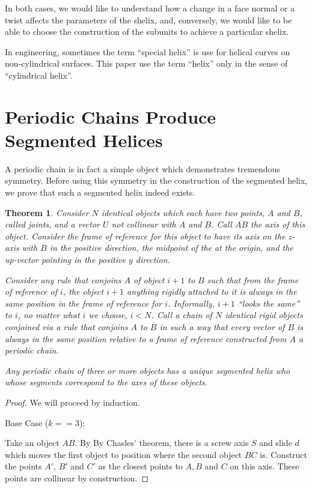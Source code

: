 \documentclass[11pt]{article}
\newtheorem{theorem}{Theorem}
\begin{document}
{In both cases, we would like to understand how a change in a face normal or a twist affects the parameters of the shelix,
and, conversely, we would like to be able to choose the construction of the subunits to achieve a particular shelix.

In engineering, sometimes the term ``special helix''\cite{gu2012research} is use for helical curves on non-cylindrical surfaces. This paper use the term ``helix'' only in the sense of ``cylindrical helix''.

\section{Periodic Chains Produce Segmented Helices}

A periodic chain is in fact a simple object which demonstrates tremendous symmetry.
Before using this symmetry in the construction of the segmented helix, we
prove that such a segmented helix indeed exists.

\begin{theorem}
  Consider $N$ identical objects which each have two points, $A$ and $B$, called {\em joints},
  and a vector $U$ not collinear with $A$ and $B$. Call
  $\overline{AB}$ the {\em axis} of this object.
  Consider the frame of reference for this object to have
  its axis on the $z$-axis with $B$ in the positive direction, the
  midpoint of the at the origin, and the up-vector pointing in the positive $y$ direction.

  Consider any rule that conjoins $A$ of object $i+1$ to $B$ such that
  from the frame of reference of $i$, the object $i+1$ anything rigidly
  attached to it is always in the same position in the frame of reference for $i$.
  Informally, $i+1$ ``looks the same'' to $i$, no matter what $i$ we choose, $i < N$.
  Call a chain of $N$ identical rigid objects conjoined via a rule that
  conjoins $A$ to $B$ in such a way that every vector 
  of $B$ is always in the same position relative to a frame of reference
  constructed from $A$ a {\em periodic chain.}
  
  Any periodic chain of three or more objects has a unique segmented helix who
  whose segments correspond
  to the axes of these objects.
\end{theorem}

\begin{proof}
  We will proceed by induction.

  Base Case ($k == 3$):

  Take an object $AB$. By By Chasles' theorem, there is a screw axis $S$ and slide $d$ which moves the first object to
  position where the second object $BC$ is. Construct the points $A'$, $B'$ and $C'$ as the closest points
  to $A,B$ and $C$ on this axis. These points are collinear by construction.


\end{proof}}
\end{document}
